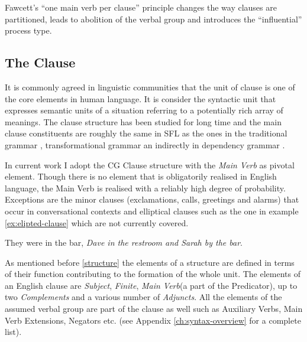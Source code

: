Fawcett's ``one main verb per clause'' principle changes the way clauses are partitioned, leads to abolition of the verbal group and introduces the ``influential'' process type.

\subsection{The Clause}
\label{sec:cardiff-clause}
It is commonly agreed in linguistic communities that the unit of clause is one of the core elements in human language. It is consider the syntactic unit that expresses semantic units of a situation referring to a potentially rich array of meanings. The clause structure has been studied for long time and the main clause constituents are roughly the same in SFL as the ones in the traditional grammar \citep{Quirk1985}, transformational grammar \citep{Chomsky1957} an indirectly in dependency grammar \citep{Hudson2010}.

In current work I adopt the CG Clause structure with the \textit{Main Verb} as pivotal element. Though there is no element that is obligatorily realised in English language, the Main Verb is realised with a reliably high degree of probability. Exceptions are the minor clauses (exclamations, calls, greetings and alarms) that occur in conversational contexts and elliptical clauses \citet{Halliday2013} such as the one in example \ref{ex:elipted-clause} which are not currently covered.

\begin{exe}
	\ex\label{ex:elipted-clause} They were in the bar, \textit{Dave in the restroom and Sarah by the bar}.
\end{exe}

As mentioned before \ref{structure} the elements of a structure are defined in terms of their function contributing to the formation of the whole unit. The elements of an English clause are \textit{Subject}, \textit{Finite}, \textit{Main Verb}(a part of the Predicator), up to two \textit{Complements} and a various number of \textit{Adjuncts}. All the elements of the assumed verbal group are part of the clause as well such as Auxiliary Verbs, Main Verb Extensions, Negators etc. (see Appendix \ref{ch:syntax-overview} for a complete list). 



